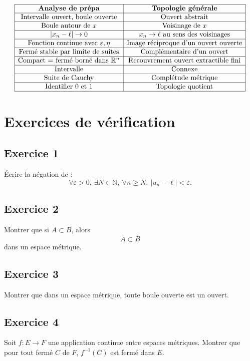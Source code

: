 \documentclass[11pt,a4paper]{article}
\theoremstyle{definition}
\theoremstyle{plain}
\newcommand{\R}{\mathbb{R}}
\newcommand{\N}{\mathbb{N}}
\newcommand{\eps}{\varepsilon}
\begin{document}
\[
\begin{array}{|c|c|}
\hline
\textbf{Analyse de prépa} & \textbf{Topologie générale}\\
\hline
\text{Intervalle ouvert, boule ouverte} & \text{Ouvert abstrait}\\
\hline
\text{Boule autour de }x & \text{Voisinage de }x\\
\hline
|x_n-\ell|\to 0 & x_n\to \ell \text{ au sens des voisinages}\\
\hline
\text{Fonction continue avec }\eps,\eta
&
\text{Image réciproque d'un ouvert ouverte}\\
\hline
\text{Fermé stable par limite de suites}
&
\text{Complémentaire d'un ouvert}\\
\hline
\text{Compact = fermé borné dans }\R^n
&
\text{Recouvrement ouvert extractible fini}\\
\hline
\text{Intervalle}
&
\text{Connexe}\\
\hline
\text{Suite de Cauchy}
&
\text{Complétude métrique}\\
\hline
\text{Identifier }0\text{ et }1
&
\text{Topologie quotient}\\
\hline
\end{array}
\]

\section{Exercices de vérification}

\subsection*{Exercice 1}
Écrire la négation de :
\[
\forall \eps>0,\ \exists N\in\N,\ \forall n\geq N,\ |u_n-\ell|<\eps.
\]

\subsection*{Exercice 2}
Montrer que si $A\subset B$, alors
\[
\overline A\subset \overline B
\]
dans un espace métrique.

\subsection*{Exercice 3}
Montrer que dans un espace métrique, toute boule ouverte est un ouvert.

\subsection*{Exercice 4}
Soit $f:E\to F$ une application continue entre espaces métriques.
Montrer que pour tout fermé $C$ de $F$, $f^{-1}(C)$ est fermé dans $E$.
\end{document}
